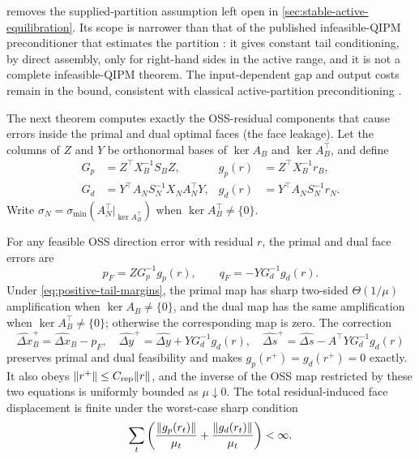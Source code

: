  removes the
supplied-partition assumption left open in
\cref{sec:stable-active-equilibration}.  Its scope is narrower than that of the
published infeasible-QIPM preconditioner that estimates the partition
\cite{zeguan2026-preconditioned-inexact-infeasible-quantum-interi}: it gives
constant tail conditioning, by direct assembly, only for right-hand sides in
the active range, and it is not a complete infeasible-QIPM theorem.  The
input-dependent gap and output costs remain in the bound, consistent with
classical active-partition preconditioning
\cite{positive-chai2007-preconditioning}.

The next theorem computes exactly the OSS-residual components that cause
errors inside the primal and dual optimal faces (the face leakage).  Let the columns of $Z$ and $Y$ be orthonormal bases of
$\ker A_B$ and $\ker A_B^\top$, and define
\begin{align}
 G_p&=Z^\top X_B^{-1}S_BZ,&g_p(r)&=Z^\top X_B^{-1}r_B,\nonumber\\
 G_d&=Y^\top A_N S_N^{-1}X_NA_N^\top Y,&
 g_d(r)&=Y^\top A_NS_N^{-1}r_N.                              \label{eq:positive-leakage-data}
\end{align}
Write
$\sigma_N=\sigma_{\min}(A_N^\top|_{\ker A_B^\top})$ when
$\ker A_B^\top\ne\{0\}$.

\begin{theorem}
\label{thm:positive-face-repair}
For any feasible OSS direction error with residual $r$, the primal and dual
face errors are
\begin{equation}
 p_F=ZG_p^{-1}g_p(r),\qquad q_F=-YG_d^{-1}g_d(r).         \label{eq:positive-face-errors}
\end{equation}
Under \eqref{eq:positive-tail-margins}, the primal map has sharp two-sided
$\Theta(1/\mu)$ amplification when $\ker A_B\ne\{0\}$, and the dual map has
the same amplification when $\ker A_B^\top\ne\{0\}$; otherwise the corresponding
map is zero.  The correction
\begin{equation}
 \widehat{\Delta x}^{+}_B=\widehat{\Delta x}_B-p_F,\quad
 \widehat{\Delta y}^{+}=\widehat{\Delta y}+YG_d^{-1}g_d(r),\quad
 \widehat{\Delta s}^{+}=\widehat{\Delta s}-A^\top YG_d^{-1}g_d(r)  \label{eq:positive-face-correction}
\end{equation}
preserves primal and dual feasibility and makes $g_p(r^+)=g_d(r^+)=0$ exactly.
It also obeys $\lVert r^+\rVert\leq C_{\rm rep}\lVert r\rVert$, and the inverse of the OSS
map restricted by these two equations is uniformly bounded as $\mu\downarrow0$.
The total residual-induced face displacement is finite under the
worst-case sharp condition
\begin{equation}
 \sum_t\left(\frac{\lVert g_p(r_t)\rVert}{\mu_t}
             +\frac{\lVert g_d(r_t)\rVert}{\mu_t}\right)<\infty.    \label{eq:positive-leakage-ledger}
\end{equation}
\end{theorem}

